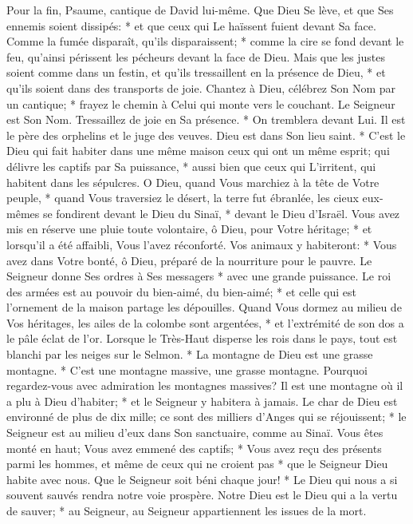 Pour la fin, Psaume, cantique de David lui-même.
Que Dieu Se lève, et que Ses ennemis soient dissipés: * et que ceux qui Le haïssent fuient devant Sa face.
Comme la fumée disparaît, qu'ils disparaissent; * comme la cire se fond devant le feu, qu'ainsi périssent les pécheurs devant la face de Dieu.
Mais que les justes soient comme dans un festin, et qu'ils tressaillent en la présence de Dieu, * et qu'ils soient dans des transports de joie.
Chantez à Dieu, célébrez Son Nom par un cantique; * frayez le chemin à Celui qui monte vers le couchant. Le Seigneur est Son Nom. Tressaillez de joie en Sa présence. * On tremblera devant Lui.
Il est le père des orphelins et le juge des veuves. Dieu est dans Son lieu saint. *
C'est le Dieu qui fait habiter dans une même maison ceux qui ont un même esprit; qui délivre les captifs par Sa puissance, * aussi bien que ceux qui L'irritent, qui habitent dans les sépulcres.
O Dieu, quand Vous marchiez à la tête de Votre peuple, * quand Vous traversiez le désert,
la terre fut ébranlée, les cieux eux-mêmes se fondirent devant le Dieu du Sinaï, * devant le Dieu d'Israël.
Vous avez mis en réserve une pluie toute volontaire, ô Dieu, pour Votre héritage; * et lorsqu'il a été affaibli, Vous l'avez réconforté.
Vos animaux y habiteront: * Vous avez dans Votre bonté, ô Dieu, préparé de la nourriture pour le pauvre.
Le Seigneur donne Ses ordres à Ses messagers * avec une grande puissance.
Le roi des armées est au pouvoir du bien-aimé, du bien-aimé; * et celle qui est l'ornement de la maison partage les dépouilles.
Quand Vous dormez au milieu de Vos héritages, les ailes de la colombe sont argentées, * et l'extrémité de son dos a le pâle éclat de l'or.
Lorsque le Très-Haut disperse les rois dans le pays, tout est blanchi par les neiges sur le Selmon. *
La montagne de Dieu est une grasse montagne. * C'est une montagne massive, une grasse montagne.
Pourquoi regardez-vous avec admiration les montagnes massives? Il est une montagne où il a plu à Dieu d'habiter; * et le Seigneur y habitera à jamais.
Le char de Dieu est environné de plus de dix mille; ce sont des milliers d'Anges qui se réjouissent; * le Seigneur est au milieu d'eux dans Son sanctuaire, comme au Sinaï.
Vous êtes monté en haut; Vous avez emmené des captifs; * Vous avez reçu des présents parmi les hommes, et même de ceux qui ne croient pas * que le Seigneur Dieu habite avec nous.
Que le Seigneur soit béni chaque jour! * Le Dieu qui nous a si souvent sauvés rendra notre voie prospère.
Notre Dieu est le Dieu qui a la vertu de sauver; * au Seigneur, au Seigneur appartiennent les issues de la mort.

